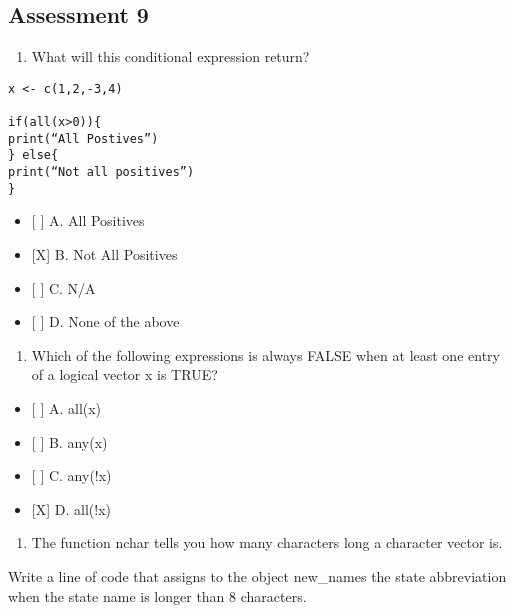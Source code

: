 \documentclass[]{article}
\providecommand{\tightlist}{%
  \setlength{\itemsep}{0pt}\setlength{\parskip}{0pt}}
\begin{document}
\hypertarget{assessment-9}{%
\subsection{Assessment 9}\label{assessment-9}}

\begin{enumerate}
\def\labelenumi{\arabic{enumi}.}
\tightlist
\item
  What will this conditional expression return?
\end{enumerate}

\begin{verbatim}
x <- c(1,2,-3,4)

if(all(x>0)){
print(“All Postives”)
} else{
print(“Not all positives”)
}
\end{verbatim}

\begin{itemize}
\tightlist
\item
  {[} {]} A. All Positives
\item
  {[}X{]} B. Not All Positives
\item
  {[} {]} C. N/A
\item
  {[} {]} D. None of the above
\end{itemize}

\begin{enumerate}
\def\labelenumi{\arabic{enumi}.}
\setcounter{enumi}{1}
\tightlist
\item
  Which of the following expressions is always FALSE when at least one
  entry of a logical vector x is TRUE?
\end{enumerate}

\begin{itemize}
\tightlist
\item
  {[} {]} A. all(x)
\item
  {[} {]} B. any(x)
\item
  {[} {]} C. any(!x)
\item
  {[}X{]} D. all(!x)
\end{itemize}

\begin{enumerate}
\def\labelenumi{\arabic{enumi}.}
\setcounter{enumi}{2}
\tightlist
\item
  The function nchar tells you how many characters long a character
  vector is.
\end{enumerate}

Write a line of code that assigns to the object new\_names the state
abbreviation when the state name is longer than 8 characters.
\end{document}
